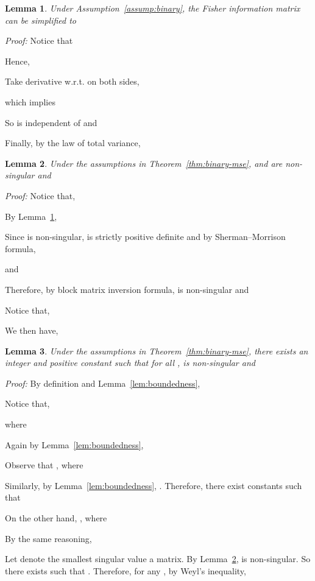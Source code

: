 \documentclass[11pt,a4paper]{article}
\newtheorem{lemma}{Lemma}[section]
\begin{document}
\begin{lemma}
  Under Assumption~\ref{assump:binary}, the Fisher information matrix can be simplified to 
  
  \label{lem:fisher}
\end{lemma}
{\em Proof: }
Notice that 

Hence,

Take derivative w.r.t.  on both sides,

which implies

So  is independent of  and 

Finally, by the law of total variance, 



\begin{lemma} 
Under the assumptions in Theorem~\ref{thm:binary-mse},  and  are non-singular and

\label{lem:w-mu-limit}
\end{lemma}
{\em Proof: }
Notice that, 

By Lemma~\ref{lem:fisher}, 

Since  is non-singular,  is strictly positive definite and by Sherman–Morrison formula, 

and

Therefore, by block matrix inversion formula,  is non-singular and 

Notice that, 

We then have,



\begin{lemma}
Under the assumptions in Theorem~\ref{thm:binary-mse}, there exists an integer  and positive constant  such that for all ,  is non-singular and 

\label{lem:w-mu-bound}
\end{lemma}

{\em Proof: }By definition and Lemma~\ref{lem:boundedness},

Notice that, 
  
  where 

Again by Lemma~\ref{lem:boundedness},

Observe that , where 

Similarly, by Lemma~\ref{lem:boundedness}, 
. Therefore, there exist constants  such that


On the other hand, , where 

By the same reasoning,

Let  denote the smallest singular value a matrix. By Lemma~\ref{lem:w-mu-limit},  is non-singular. 
So there exists  such that . Therefore, for any , by Weyl's inequality, 
\end{document}
